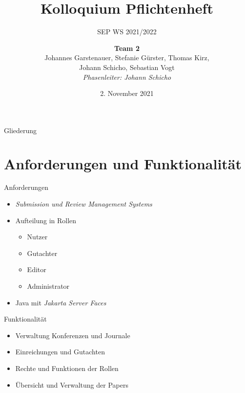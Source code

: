 \documentclass{beamer}
\title{Kolloquium Pflichtenheft}
\subtitle{SEP WS 2021/2022}
\date{\small 2. November 2021}
\author{\textbf{Team 2} \\ \small {Johannes Garstenauer, Stefanie Gürster, Thomas Kirz,\\ Johann Schicho, Sebastian Vogt} \\ \vspace{0.5cm}\emph{Phasenleiter: Johann Schicho}\normalsize}
\begin{document}
	\begin{frame}
		\titlepage
	\end{frame}

	\begin{frame}{Gliederung}
		\tableofcontents
	\end{frame}

\section{Anforderungen und Funktionalität}

\begin{frame}{Anforderungen}
	\begin{itemize}
		\item \emph{Submission und Review Management Systems}
		\pause %

		\item Aufteilung in Rollen
		\begin{itemize}
			\item Nutzer
			\item Gutachter
			\item Editor
			\item Administrator
		\end{itemize}
		\pause

		\item Java mit \emph{Jakarta Server Faces}

	\end{itemize}
\end{frame}

\begin{frame}{Funktionalität}
	\begin{itemize}
		\item Verwaltung Konferenzen und Journale
		\pause
		\item Einreichungen und Gutachten
		\pause
		\item Rechte und Funktionen der Rollen
		\pause
		\item Übersicht und Verwaltung der Papers
	\end{itemize}
\end{frame}
\end{document}
